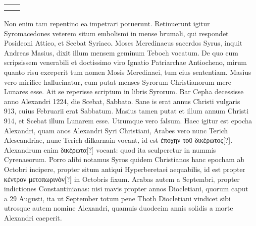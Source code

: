 
\begin{table}[htbp]
  \centering
  \begin{tabular}{c c}
    \begin{minipage}[][0.44\linewidth][t]{0.4\linewidth}
      
    \end{minipage}
&
    \begin{minipage}[][0.44\linewidth][t]{0.4\linewidth}
      
    \end{minipage} \\
    \addlinespace[0.85in] %
  \end{tabular}
\end{table}

Non enim tam repentino ea impetrari potuerunt.
Retinuerunt
igitur Syromacedones veterem situm embolismi in mense brumali,
qui respondet Posideoni Attico, et Scebat Syriaco.
Moses
Meredinaeus sacerdos Syrus, inquit Andreas Masius, dixit illum mensem
geminum Teboch vocatum.
De quo cum scripsissem venerabili et
doctissimo viro Ignatio Patriarchae Antiocheno, mirum quanto risu
exceperit tum nomen Mosis Meredinaei, tum eius sententiam.
Masius
vero mirifice hallucinatur, cum putat menses Syrorum Christianorum
mere Lunares esse.
Ait se reperisse scriptum in libris Syrorum.
Bar Cepha decessisse anno Alexandri 1224,
 die  Scebat, Sabbato.
Sane is erat annus Christi vulgaris 913, cuius  Februarii erat
Sabbatum.
Masius tamen putat et illum annum Christi 914, et Scebat
illum Lunarem esse.
Utrumque vero falsum.
Haec igitur est
epocha Alexandri, quam anos Alexandri Syri Christiani, Arabes
vero nunc Terich Alescandriae, nunc Terich dilkarnain vocant, id est
\textgreek{ἐποχην τοῦ δικέρωτος[?]}.
Alexandrum enim \textgreek{δικέρωτα[?]} vocant: quod ita sculperetur
in nummis Cyrenaeorum.
Porro alibi notamus Syros quidem
Christianos hanc epocham ab Octobri incipere, propter situm antiqui
Hyperberetaei aequabilis, id est propter
 \textgreek{κέντρον μετοπωρινὸν[?]} in 
Octobris fixum.
Arabas autem a Septembri, propter indictiones Constantinianas:
nisi mavis propter annos Diocletiani, quorum caput a 29
Augusti, ita ut September totum pene Thoth Diocletiani vindicet sibi
utrosque autem nomine Alexandri, quamuis duodecim annis solidis
a morte Alexandri caeperit.
\begin{table}[htbp]
 
\end{table}

